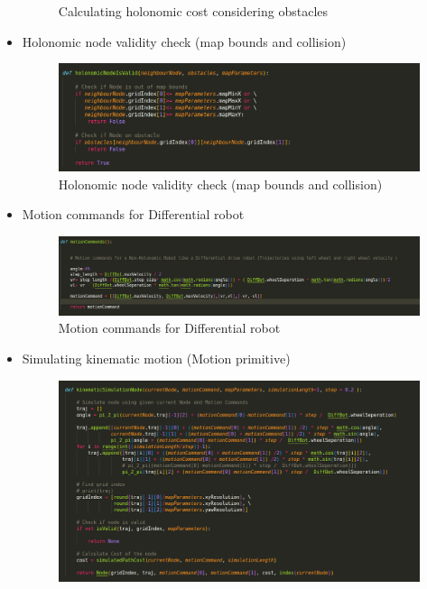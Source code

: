 \documentclass[12pt,a4paper]{article}
\begin{document}
\begin{itemize}
\begin{figure}[h!]
\begin{center}
        \end{center}
        \caption{Calculating holonomic cost considering obstacles}
        \label{fig:Hybrid_A-star}
        \end{figure}
    \item Holonomic node validity check (map bounds and collision)
        \begin{figure}[h!]
        \begin{center}
        \includegraphics[width=0.8\columnwidth]{algorithm/holonomic_validation.jpeg}
        \end{center}
        \caption{Holonomic node validity check (map bounds and collision)}
        \label{fig:Hybrid_A-star}
        \end{figure}
    \item Motion commands for Differential robot
        \begin{figure}[h!]
        \begin{center}
        \includegraphics[width=0.8\columnwidth]{algorithm/diff_motion_command.png}
        \end{center}
        \caption{Motion commands for Differential robot}
        \label{fig:Hybrid_A-star}
        \end{figure}
    \item Simulating kinematic motion (Motion primitive)
        \begin{figure}[h!]
        \begin{center}
        \includegraphics[width=0.8\columnwidth]{algorithm/motion_prmitive.png}

\end{center}
\end{figure}
\end{itemize}
\end{document}
